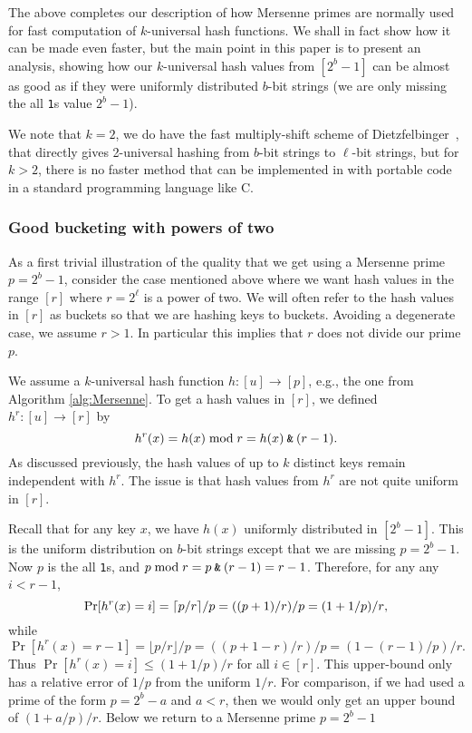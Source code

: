 The above completes our description of how Mersenne primes are
normally used for fast computation of $k$-universal hash functions.
We shall in fact show how it can be made even faster, but the main
point in this paper is to present an analysis, showing how our
$k$-universal hash values from $[2^b-1]$ can be almost as good as if
they were uniformly distributed $b$-bit strings (we are only missing
the all \texttt{1}s value $2^b-1$). 

We note that $k=2$, we do have the fast multiply-shift scheme of Dietzfelbinger~\cite{dietzfel96universal}, that directly gives 2-universal
hashing from $b$-bit strings to $\ell$-bit strings, but for $k>2$,
there is no faster method that can be implemented in with portable code
in a standard programming language like C.




\subsubsection{Good bucketing with powers of two}\label{sec:power-of-two}
As a first trivial illustration of the quality that we get using a
Mersenne prime $p=2^b-1$, consider the case mentioned above where we
want hash values in the range $[r]$ where $r=2^\ell$ is a power of
two. We will often refer to the hash values in $[r]$ as buckets so
that we are hashing keys to buckets. Avoiding a degenerate case, we
assume $r>1$. In particular this implies that $r$ does not divide our
prime $p$.

We assume a $k$-universal hash function $h:[u]\to[p]$, e.g.,
the one from Algorithm \ref{alg:Mersenne}. To get a hash values in $[r]$,
we defined $h^r:[u]\to[r]$ by
\[h^r(x)=h(x)\bmod r=h(x)\mathbin{\texttt{\&}} (r-1).\]
As discussed previously, the hash values of up to $k$ distinct keys remain
independent with $h^r$. The issue is that hash values from 
$h^r$ are not quite uniform in $[r]$.

Recall that for any key $x$, we have $h(x)$ uniformly distributed in $[2^b-1]$.
This is the uniform distribution on $b$-bit strings except that we are
missing $p=2^b-1$. Now $p$ is the all \texttt{1}s, and 
$p \bmod r = p\mathbin{\texttt{\&}} (r-1) = r-1$. Therefore, for any 
any $i<r-1$,
\begin{equation}\label{eq:coll-ell<r-1}
   \Pr[h^r(x)=i]=\lceil p/r\rceil/p=((p+1)/r)/p
   =(1+1/p)/r\textnormal,
\end{equation}
while 
\begin{equation}\label{eq:coll-ell=r-1}
   \Pr[h^r(x)=r-1]=\lfloor p/r\rfloor/p=((p+1-r)/r)/p
   =(1-(r-1)/p)/r.
\end{equation}
Thus $\Pr[h^r(x)=i]\leq (1+1/p)/r$ for all $i\in[r]$. This upper-bound
only has a relative error of $1/p$ from the uniform $1/r$. For
comparison, if we had used a prime of the form $p=2^b-a$ and $a<r$, then
we would only get an upper bound of $(1+a/p)/r$. Below we return
to a Mersenne prime $p=2^b-1$

